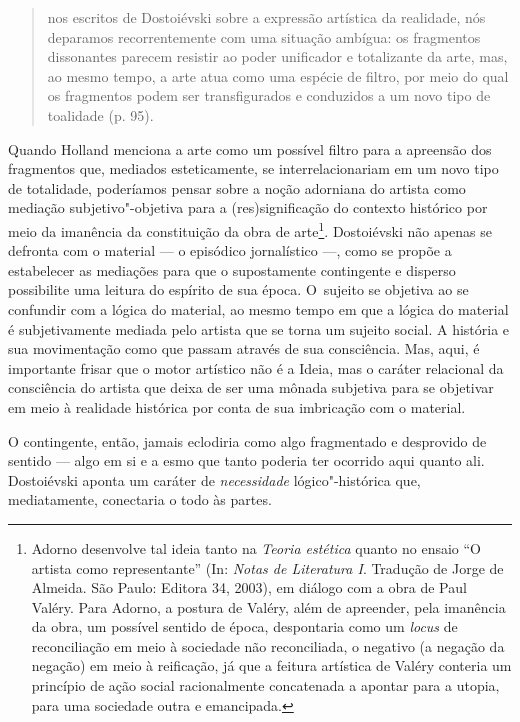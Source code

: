 \begin{quote}
nos escritos de Dostoiévski sobre a expressão artística da realidade,
nós deparamos recorrentemente com uma situação ambígua: os fragmentos
dissonantes parecem resistir ao poder unificador e totalizante da arte,
mas, ao mesmo tempo, a arte atua como uma espécie de filtro, por meio do
qual os fragmentos podem ser transfigurados e conduzidos a um novo tipo
de toalidade (p. 95).
\end{quote}

Quando Holland menciona a arte como um possível filtro para a apreensão
dos fragmentos que, mediados esteticamente, se interrelacionariam em um
novo tipo de totalidade, poderíamos pensar sobre a noção adorniana do
artista como mediação subjetivo"-objetiva para a (res)significação do
contexto histórico por meio da imanência da constituição da obra de
arte\footnote{Adorno desenvolve tal ideia tanto na \emph{Teoria
  estética} quanto no ensaio ``O artista como representante'' (In:
  \emph{Notas de Literatura I}. Tradução de Jorge de Almeida. São Paulo:
  Editora 34, 2003), em diálogo com a obra de Paul Valéry. Para Adorno,
  a postura de Valéry, além de apreender, pela imanência da obra, um
  possível sentido de época, despontaria como um \emph{locus} de
  reconciliação em meio à sociedade não reconciliada, o negativo (a
  negação da negação) em meio à reificação, já que a feitura artística
  de Valéry conteria um princípio de ação social racionalmente
  concatenada a apontar para a utopia, para uma sociedade outra e
  emancipada.}. Dostoiévski não apenas se defronta com o material --- o
episódico jornalístico ---, como se propõe a estabelecer as mediações
para que o supostamente contingente e disperso possibilite uma leitura
do espírito de sua época. O~sujeito se objetiva ao se confundir com a
lógica do material, ao mesmo tempo em que a lógica do material é
subjetivamente mediada pelo artista que se torna um sujeito social. A
história e sua movimentação como que passam através de sua consciência.
Mas, aqui, é importante frisar que o motor artístico não é a Ideia, mas
o caráter relacional da consciência do artista que deixa de ser uma
mônada subjetiva para se objetivar em meio à realidade histórica por
conta de sua imbricação com o material.

O contingente, então, jamais eclodiria como algo fragmentado e
desprovido de sentido --- algo em si e a esmo que tanto poderia ter
ocorrido aqui quanto ali. Dostoiévski aponta um caráter de
\emph{necessidade} lógico"-histórica que, mediatamente, conectaria o todo
às partes.

